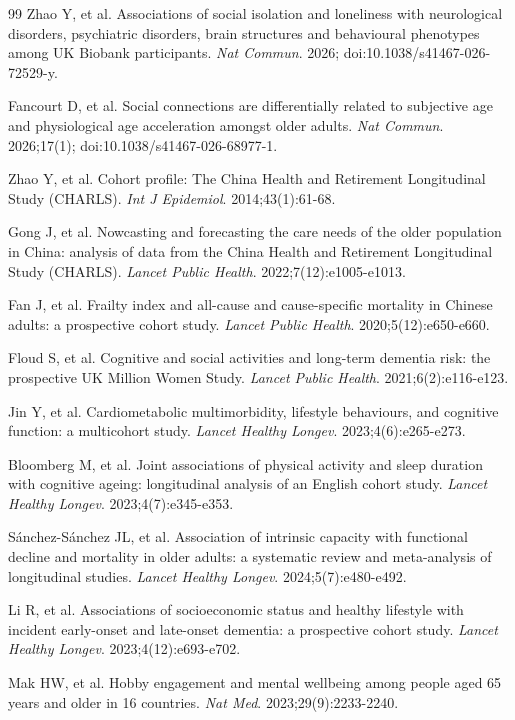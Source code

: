 \documentclass[10pt]{article}
\begin{document}
\begin{thebibliography}{99}
Zhao Y, et al. Associations of social isolation and loneliness with neurological disorders, psychiatric disorders, brain structures and behavioural phenotypes among UK Biobank participants. \textit{Nat Commun}. 2026; doi:10.1038/s41467-026-72529-y.

Fancourt D, et al. Social connections are differentially related to subjective age and physiological age acceleration amongst older adults. \textit{Nat Commun}. 2026;17(1); doi:10.1038/s41467-026-68977-1.

Zhao Y, et al. Cohort profile: The China Health and Retirement Longitudinal Study (CHARLS). \textit{Int J Epidemiol}. 2014;43(1):61-68.

Gong J, et al. Nowcasting and forecasting the care needs of the older population in China: analysis of data from the China Health and Retirement Longitudinal Study (CHARLS). \textit{Lancet Public Health}. 2022;7(12):e1005-e1013.

Fan J, et al. Frailty index and all-cause and cause-specific mortality in Chinese adults: a prospective cohort study. \textit{Lancet Public Health}. 2020;5(12):e650-e660.

Floud S, et al. Cognitive and social activities and long-term dementia risk: the prospective UK Million Women Study. \textit{Lancet Public Health}. 2021;6(2):e116-e123.

Jin Y, et al. Cardiometabolic multimorbidity, lifestyle behaviours, and cognitive function: a multicohort study. \textit{Lancet Healthy Longev}. 2023;4(6):e265-e273.

Bloomberg M, et al. Joint associations of physical activity and sleep duration with cognitive ageing: longitudinal analysis of an English cohort study. \textit{Lancet Healthy Longev}. 2023;4(7):e345-e353.

Sánchez-Sánchez JL, et al. Association of intrinsic capacity with functional decline and mortality in older adults: a systematic review and meta-analysis of longitudinal studies. \textit{Lancet Healthy Longev}. 2024;5(7):e480-e492.

Li R, et al. Associations of socioeconomic status and healthy lifestyle with incident early-onset and late-onset dementia: a prospective cohort study. \textit{Lancet Healthy Longev}. 2023;4(12):e693-e702.

Mak HW, et al. Hobby engagement and mental wellbeing among people aged 65 years and older in 16 countries. \textit{Nat Med}. 2023;29(9):2233-2240.


\end{thebibliography}
\end{document}
